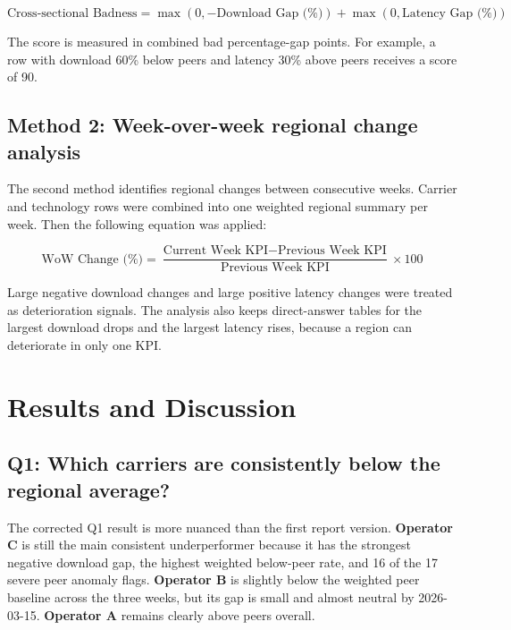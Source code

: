 \documentclass[12pt,a4paper]{article}
\begin{document}
\[
\text{Cross-sectional Badness} =
\max(0, -\text{Download Gap (\%)}) + \max(0, \text{Latency Gap (\%)})
\]

The score is measured in combined bad percentage-gap points. For example, a row with download 60\% below peers and latency 30\% above peers receives a score of 90.

\subsection{Method 2: Week-over-week regional change analysis}

The second method identifies regional changes between consecutive weeks. Carrier and technology rows were combined into one weighted regional summary per week. Then the following equation was applied:

\[
\text{WoW Change (\%)} =
\frac{\text{Current Week KPI} - \text{Previous Week KPI}}{\text{Previous Week KPI}} \times 100
\]

Large negative download changes and large positive latency changes were treated as deterioration signals. The analysis also keeps direct-answer tables for the largest download drops and the largest latency rises, because a region can deteriorate in only one KPI.

\section{Results and Discussion}

\subsection{Q1: Which carriers are consistently below the regional average?}

The corrected Q1 result is more nuanced than the first report version. \textbf{Operator C} is still the main consistent underperformer because it has the strongest negative download gap, the highest weighted below-peer rate, and 16 of the 17 severe peer anomaly flags. \textbf{Operator B} is slightly below the weighted peer baseline across the three weeks, but its gap is small and almost neutral by 2026-03-15. \textbf{Operator A} remains clearly above peers overall.
\end{document}
